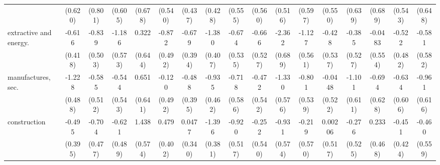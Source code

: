 {\begin{tabular}{l*{16}{c}}
                    &     (0.620)         &     (0.801)         &     (0.605)         &     (0.678)         &     (0.540)         &     (0.437)         &     (0.428)         &     (0.555)         &     (0.560)         &     (0.516)         &     (0.597)         &     (0.550)         &     (0.639)         &     (0.689)         &     (0.543)         &     (0.648)         \\
[1em]
extractive and energy.&      -0.616         &      -0.839         &      -1.186\sym{*}  &       0.322         &      -0.872         &      -0.679         &      -1.380\sym{***}&      -0.674         &      -0.666         &      -2.362\sym{***}&      -1.127\sym{*}  &      -0.428         &      -0.385         &     -0.0483         &      -0.522         &      -0.581         \\
                    &     (0.418)         &     (0.503)         &     (0.573)         &     (0.644)         &     (0.492)         &     (0.394)         &     (0.407)         &     (0.535)         &     (0.527)         &     (0.689)         &     (0.561)         &     (0.537)         &     (0.527)         &     (0.554)         &     (0.482)         &     (0.582)         \\
[1em]
manufactures, sec.  &      -1.228\sym{*}  &      -0.585         &      -0.544         &       0.651         &      -0.120         &      -0.488         &      -0.935\sym{*}  &      -0.718         &      -0.472         &      -1.330\sym{*}  &      -0.801         &     -0.0448         &      -1.101         &      -0.694         &      -0.634         &      -0.961         \\
                    &     (0.488)         &     (0.512)         &     (0.543)         &     (0.641)         &     (0.492)         &     (0.395)         &     (0.462)         &     (0.586)         &     (0.542)         &     (0.576)         &     (0.539)         &     (0.522)         &     (0.611)         &     (0.628)         &     (0.606)         &     (0.616)         \\
[1em]
construction        &      -0.495         &      -0.704         &      -0.621         &       1.438\sym{*}  &       0.479         &      0.0477         &      -1.396\sym{***}&      -0.920         &      -0.252         &      -0.931         &      -0.219         &     0.00206         &      -0.276         &       0.233         &      -0.451         &      -0.460         \\
                    &     (0.395)         &     (0.477)         &     (0.489)         &     (0.574)         &     (0.402)         &     (0.340)         &     (0.381)         &     (0.517)         &     (0.540)         &     (0.574)         &     (0.570)         &     (0.517)         &     (0.525)         &     (0.468)         &     (0.424)         &     (0.559)         \\

\end{tabular}}
